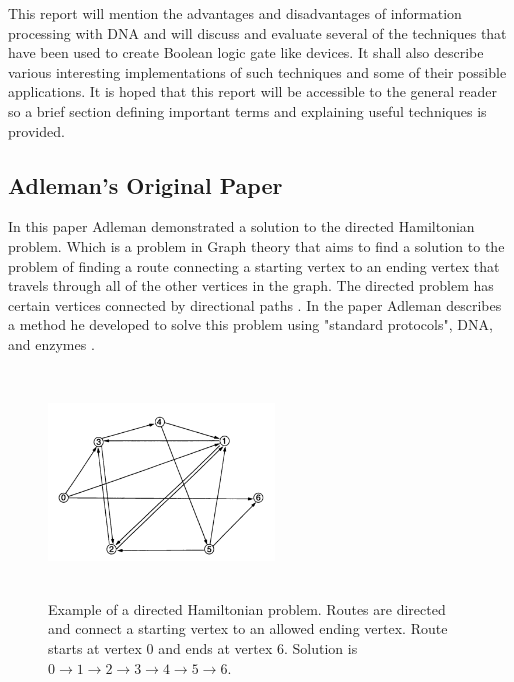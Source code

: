 \documentclass[11pt,a4paper,portrait]{article}
\begin{document}
This report will mention the advantages and disadvantages of information processing with DNA and will discuss and evaluate several of the techniques that have been used to create Boolean logic gate like devices. It shall also describe various interesting implementations of such techniques and some of their possible applications. It is hoped that this report will be accessible to the general reader so a brief section defining important terms and explaining useful techniques is provided.

\newpage
\subsection{Adleman's Original Paper}
In this paper Adleman demonstrated a solution to the directed Hamiltonian problem. Which is a problem in Graph theory that aims to find a solution to the problem of finding a route connecting a starting vertex to an ending vertex that travels through all of the other vertices in the graph. The directed problem has certain vertices connected by directional paths \cite{Hamiltonian}. In the paper Adleman describes a method he developed to solve this problem using "standard protocols", DNA, and enzymes \cite{Adleman1994}.

\begin{figure}[ht!]

\centering
\includegraphics[width=60mm, height=60mm]{hamiltonianpath.png}
\caption{Example of a directed Hamiltonian problem. Routes are directed and connect a starting vertex to an allowed ending vertex. Route starts at vertex 0 and ends at vertex 6. Solution is $0 \rightarrow 1 \rightarrow 2 \rightarrow 3 \rightarrow 4 \rightarrow 5 \rightarrow 6$. \cite{Adleman1994}
\label{hamiltoniangraph}}
\end{figure}
\end{document}
